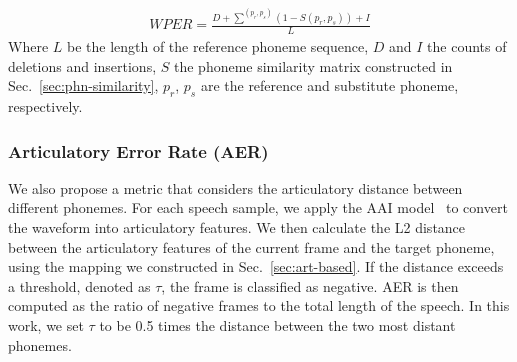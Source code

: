 \begin{table}[htp]
    \caption{Evaluation on VCTK-accent testsets with three different phoneme similarity modeling methods}
    \label{table-eval-vctk}
    \centering
    \setlength{\tabcolsep}{7pt} 
    \renewcommand{\arraystretch}{1.1} 
\end{table}
\vspace{-8mm}
\begin{align}
   WPER = \frac{D + \displaystyle \sum^{(p_r, p_s)} (1 - S(p_r, p_s)) + I}{L}
  \label{equation:wper}
\end{align}
Where $L$ be the length of the reference phoneme sequence, $D$ and $I$ the counts of deletions and insertions, $S$ the phoneme similarity matrix constructed in Sec.~\ref{sec:phn-similarity}, $p_r$, $p_s$ are the reference and substitute phoneme, respectively.

\subsubsection{Articulatory Error Rate (AER)}
We also propose a metric that considers the articulatory distance between different phonemes. For each speech sample, we apply the AAI model~\cite{cho2024jstsp} to convert the waveform into articulatory features. We then calculate the L2 distance between the articulatory features of the current frame and the target phoneme, using the mapping we constructed in Sec.~\ref{sec:art-based}. If the distance exceeds a threshold, denoted as $\tau$, the frame is classified as negative. AER is then computed as the ratio of negative frames to the total length of the speech. In this work, we set $\tau$ to be 0.5 times the distance between the two most distant phonemes.



